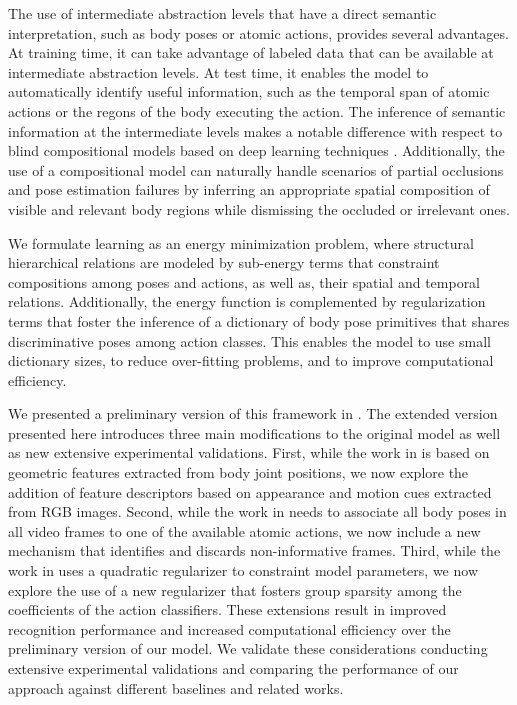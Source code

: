 The use of intermediate abstraction levels that have a direct semantic interpretation, such as body 
poses or atomic actions, provides several advantages. At training time, it can take advantage of 
labeled data that can be available at intermediate abstraction levels. At test time, it enables the 
model to automatically identify useful information, such as the temporal span of atomic actions or 
the regons of the body executing the action. The inference of semantic information at the 
intermediate levels makes a notable difference with respect to blind compositional models based on 
deep learning techniques \cite{Bengio:09}. Additionally, the use of a compositional model can 
naturally handle scenarios of partial occlusions and pose estimation failures by inferring an 
appropriate spatial composition of visible and relevant body regions while dismissing the occluded or 
irrelevant ones.

We formulate learning as an energy minimization problem, where structural hierarchical relations are 
modeled by sub-energy terms that constraint compositions among poses and actions, as well as, their 
spatial and temporal relations. Additionally, the energy function is complemented by regularization 
terms that foster the inference of a dictionary of body pose primitives that shares discriminative 
poses among action classes. This enables the model to use small dictionary sizes, to reduce 
over-fitting problems, and to improve computational efficiency.

We presented a preliminary version of this framework in \cite{Lillo2014}.
The extended version presented here
introduces three main modifications to the original model as well as new extensive experimental 
validations. First,
while the work in \cite{Lillo2014} is based on geometric features extracted from body joint 
positions, we now explore the addition of feature descriptors based on appearance and motion cues 
extracted from RGB images.
Second, while the work in \cite{Lillo2014} needs to associate all body poses in all video 
frames to one of the available atomic 
actions, we now include a new mechanism that identifies and discards non-informative frames. Third, 
while the work in \cite{Lillo2014} uses a quadratic regularizer to constraint model parameters, we 
now explore the use of a new regularizer that fosters group sparsity among the coefficients of the 
action 
classifiers. These extensions result in improved recognition performance
and increased computational efficiency over the preliminary version of our model. We validate these 
considerations conducting extensive experimental validations and comparing the performance of our 
approach against different baselines and related works.

